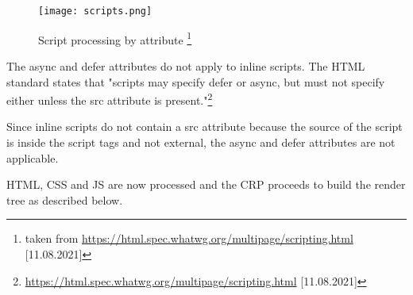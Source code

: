 \begin{figure}[h!]
\begin{center}
\texttt{[image: scripts.png]}
\caption[Script processing by attribute]{Script processing by attribute \footnote{taken from \url{https://html.spec.whatwg.org/multipage/scripting.html} [11.08.2021]}} %
\label{figure:script_loading}
\end{center}
\end{figure}


The async and defer attributes do not apply to inline scripts.
The HTML standard states that "scripts may specify defer or async, but must not specify either unless the src attribute is present."\footnote{\url{https://html.spec.whatwg.org/multipage/scripting.html} [11.08.2021]}

Since inline scripts do not contain a src attribute because the source of the script is inside the script tags and not external, the async and defer attributes are not applicable.






HTML, CSS and JS are now processed and the CRP proceeds to build the render tree as described below.







